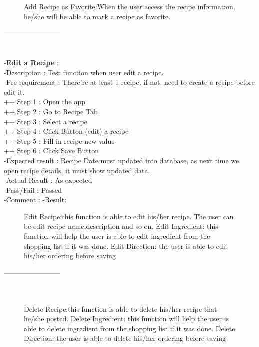 \documentclass{article}
\begin{document}
        \begin{figure}[h!]
        \centering
        Add Recipe as Favorite:When the user access the recipe information, he/she will be able to mark a recipe as favorite.
        \label{fig:cookingbook}
        \end{figure}
        ------------------------\\ \\ \\

        -\textbf{Edit a Recipe }: \\
        -Description : Test function when user edit a recipe. \\
        -Pre requirement : There're at least 1 recipe, if not, need to create a recipe before edit it. \\
        ++ Step 1 : Open the app  \\
        ++ Step 2 : Go to Recipe Tab \\
        ++ Step 3 : Select a recipe  \\
        ++ Step 4 : Click Button (edit) a recipe \\
        ++ Step 5 : Fill-in recipe new value \\
        ++ Step 6 : Click Save Button \\
        -Expected result : Recipe Date must updated into database, as next time we open recipe details, it must show updated data. \\
        -Actual Result : As expected \\
        -Pass/Fail : Passed \\
        -Comment : 
        -Result:
         \begin{figure}[h!]
        \centering
        Edit Recipe:this function is able to edit his/her recipe. The user can be edit recipe name,description and so on.
        Edit Ingredient: this function will help the user is able to edit ingredient from the shopping list if it was done.
        Edit Direction: the user is able to edit his/her ordering before saving
        \label{fig:cookingbook}
        \end{figure}
        ------------------------\\ \\ \\
        \begin{figure}[h!]
        \centering
        Delete Recipe:this function is able to delete his/her recipe that he/she posted.
        Delete Ingredient: this function will help the user is able to delete ingredient from the shopping list if it was done.
        Delete Direction: the user is able to delete his/her ordering before saving
        \label{fig:cookingbook}
        \end{figure}
\end{document}
